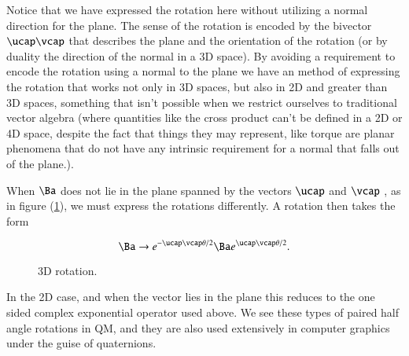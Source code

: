Notice that we have expressed the rotation here without utilizing a normal direction for the plane.  The sense of the rotation is encoded by the bivector $\ucap \vcap$ that describes the plane and the orientation of the rotation (or by duality the direction of the normal in a 3D space).  By avoiding a requirement to encode the rotation using a normal to the plane we have an method of expressing the rotation that works not only in 3D spaces, but also in 2D and greater than 3D spaces, something that isn't possible when we restrict ourselves to traditional vector algebra (where quantities like the cross product can't be defined in a 2D or 4D space, despite the fact that things they may represent, like torque are planar phenomena that do not have any intrinsic requirement for a normal that falls out of the plane.).

When $\Ba$ does not lie in the plane spanned by the vectors $\ucap$ and $\vcap$ , as in figure (\ref{fig:gaQuickIntro:gaQuickIntroFig2}), we must express the rotations differently.  A rotation then takes the form

\begin{equation}\label{eqn:gaQuickIntro:210}
\Ba \rightarrow 
e^{-\ucap \vcap \theta/2}  
\Ba 
e^{\ucap \vcap \theta/2}.
\end{equation}

\begin{figure}[htp]
   \centering
   \def\svgwidth{0.6\columnwidth}
   
   \caption{3D rotation.}\label{fig:gaQuickIntro:gaQuickIntroFig2}
\end{figure}

In the 2D case, and when the vector lies in the plane this reduces to the one sided complex exponential operator used above.  We see these types of paired half angle rotations in QM, and they are also used extensively in computer graphics under the guise of quaternions.

\EndArticle
